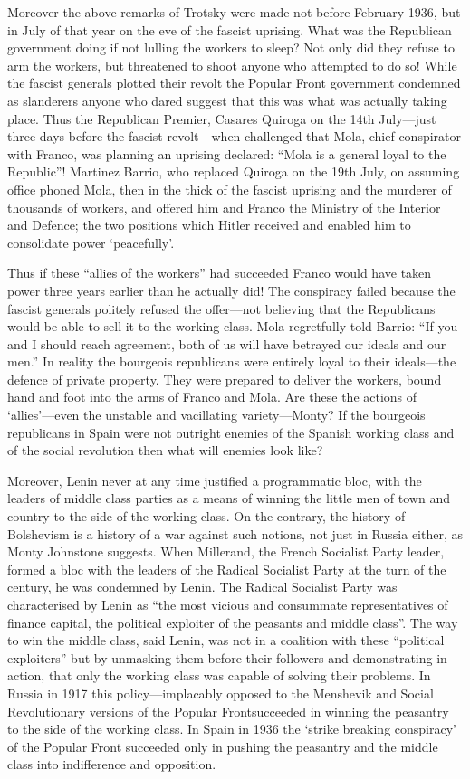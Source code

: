 \documentclass[
  12pt,
  pagesize,
  paper = 6in:9in,
  DIV = 12,
  openany
]{scrbook}
\begin{document}
Moreover the above remarks of Trotsky were made not before
February 1936, but in July of that year on the eve of the fascist uprising.
What was the Republican government doing if not lulling the
workers to sleep? Not only did they refuse to arm the workers, but
threatened to shoot anyone who attempted to do so! While the fascist
generals plotted their revolt the Popular Front government condemned
as slanderers anyone who dared suggest that this was what was
actually taking place. Thus the Republican Premier, Casares Quiroga
on the 14th July---just three days before the fascist revolt---when
challenged that Mola, chief conspirator with Franco, was planning
an uprising declared: “Mola is a general loyal to the Republic”! Martinez
Barrio, who replaced Quiroga on the 19th July, on assuming
office phoned Mola, then in the thick of the fascist uprising and the
murderer of thousands of workers, and offered him and Franco the
Ministry of the Interior and Defence; the two positions which Hitler
received and enabled him to consolidate power ‘peacefully’.

Thus if these “allies of the workers” had succeeded Franco would
have taken power three years earlier than he actually did! The
conspiracy failed because the fascist generals politely refused the
offer---not believing that the Republicans would be able to sell it to the working
class. Mola regretfully told Barrio: “If you and I should reach
agreement, both of us will have betrayed our ideals and our men.”
In reality the bourgeois republicans were entirely loyal to their
ideals---the defence of private property. They were prepared to deliver
the workers, bound hand and foot into the arms of Franco and Mola.
Are these the actions of ‘allies’---even the unstable and vacillating
variety---Monty? If the bourgeois republicans in Spain were not
outright enemies of the Spanish working class and of the social
revolution then what will enemies look like?

Moreover, Lenin never at any time justified a programmatic bloc,
with the leaders of middle class parties as a means of winning the
little men of town and country to the side of the working class. On
the contrary, the history of Bolshevism is a history of a war against
such notions, not just in Russia either, as Monty Johnstone suggests.
When Millerand, the French Socialist Party leader, formed a bloc
with the leaders of the Radical Socialist Party at the turn of the century,
he was condemned by Lenin. The Radical Socialist Party was
characterised by Lenin as “the most vicious and consummate
representatives of finance capital, the political exploiter of the
peasants and middle class”. The way to win the middle class, said
Lenin, was not in a coalition with these “political exploiters” but
by unmasking them before their followers and demonstrating in action,
that only the working class was capable of solving their problems.
In Russia in 1917 this policy---implacably opposed to the Menshevik
and Social Revolutionary versions of the Popular Frontsucceeded
in winning the peasantry to the side of the working class.
In Spain in 1936 the `strike breaking conspiracy' of the Popular Front
succeeded only in pushing the peasantry and the middle class into
indifference and opposition.
\end{document}

